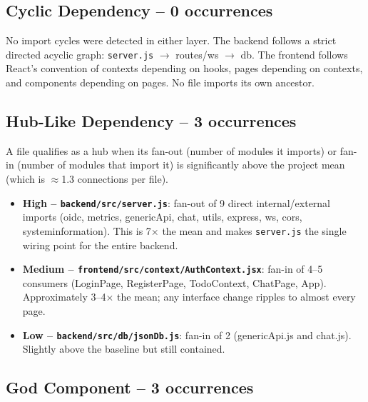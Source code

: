 %

\subsection*{Cyclic Dependency -- 0 occurrences}

No import cycles were detected in either layer. The backend follows a strict
directed acyclic graph: \texttt{server.js} $\to$ routes/ws $\to$ db. The
frontend follows React's convention of contexts depending on hooks, pages
depending on contexts, and components depending on pages. No file imports its
own ancestor.

\subsection*{Hub-Like Dependency -- 3 occurrences}

A file qualifies as a hub when its fan-out (number of modules it imports) or
fan-in (number of modules that import it) is significantly above the project
mean (which is $\approx$1.3 connections per file).

\begin{itemize}
  \item \textbf{High -- \texttt{backend/src/server.js}}: fan-out of 9 direct
    internal/external imports (oidc, metrics, genericApi, chat, utils, express,
    ws, cors, systeminformation). This is 7$\times$ the mean and makes
    \texttt{server.js} the single wiring point for the entire backend.

  \item \textbf{Medium -- \texttt{frontend/src/context/AuthContext.jsx}}:
    fan-in of 4--5 consumers (LoginPage, RegisterPage, TodoContext, ChatPage,
    App). Approximately 3--4$\times$ the mean; any interface change ripples
    to almost every page.

  \item \textbf{Low -- \texttt{backend/src/db/jsonDb.js}}: fan-in of 2
    (genericApi.js and chat.js). Slightly above the baseline but still
    contained.
\end{itemize}

\subsection*{God Component -- 3 occurrences}

